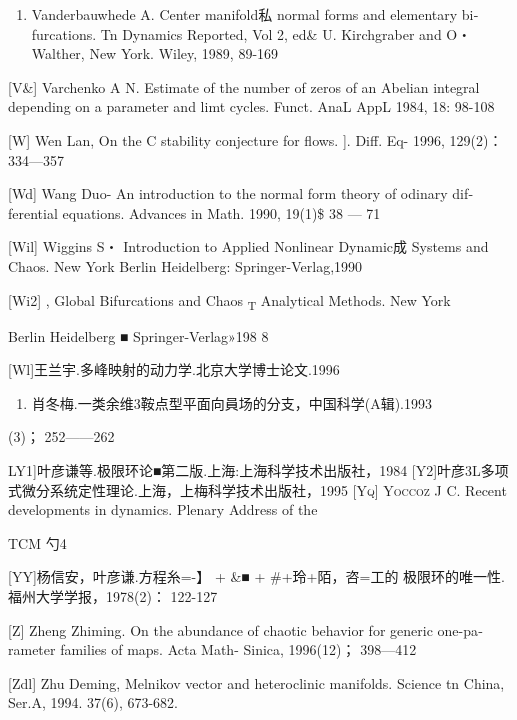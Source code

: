 \documentclass{article}
\begin{document}
\begin{enumerate}
\def\labelenumi{\Roman{enumi}.}
\setcounter{enumi}{4}
\item
  Vanderbauwhede A. Center manifold私 normal forms and elementary
  bi­furcations. Tn Dynamics Reported, Vol 2, ed\& U. Kirchgraber and
  O・ Walther, New York. Wiley, 1989, 89-169
\end{enumerate}

{[}V\&{]} Varchenko A N. Estimate of the number of zeros of an Abelian
integral depending on a parameter and limt cycles. Funct. AnaL AppL
1984, 18: 98-108

{[}W{]} Wen Lan, On the C stability conjecture for flows. {]}. Diff. Eq-
1996, 129(2)： 334---357

{[}Wd{]} Wang Duo- An introduction to the normal form theory of odinary
dif­ferential equations. Advances in Math. 1990, 19(1)\$ 38 --- 71

{[}Wil{]} Wiggins S・ Introduction to Applied Nonlinear Dynamic成
Systems and Chaos. New York Berlin Heidelberg: Springer-Verlag,1990

{[}Wi2{]} , Global Bifurcations and Chaos \textsubscript{T} Analytical
Methods. New York

Berlin Heidelberg ■ Springer-Verlag»198 8

{[}Wl{]}王兰宇.多峰映射的动力学.北京大学博士论文.1996

\begin{enumerate}
\def\labelenumi{\Roman{enumi}.}
\setcounter{enumi}{9}
\item
  肖冬梅.一类余维3鞍点型平面向員场的分支，中国科学(A辑).1993
\end{enumerate}

(3)； 252------262

LY1{]}叶彦谦等.极限环论■第二版.上海:上海科学技术出版社，1984
{[}Y2{]}叶彦3L多项式微分系统定性理论.上海，上梅科学技术出版社，1995
\textsc{{[}Yq{]} Yoccoz} J C. Recent developments in dynamics. Plenary
Address of the

TCM 勺4

{[}YY{]}杨信安，叶彦谦.方程糸=-】 + \&■ + \#+玲+陌，咨=工的
极限环的唯一性.福州大学学报，1978(2)： 122-127

{[}Z{]} Zheng Zhiming. On the abundance of chaotic behavior for generic
one-pa­rameter families of maps. Acta Math- Sinica, 1996(12)； 398---412

{[}Zdl{]} Zhu Deming, Melnikov vector and heteroclinic manifolds.
Science tn China, Ser.A, 1994. 37(6), 673-682.
\end{document}
